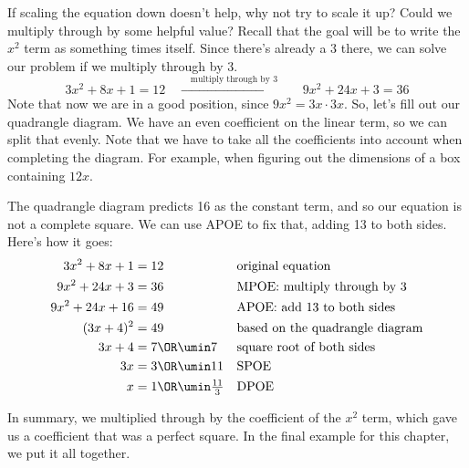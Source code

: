 If scaling the equation down doesn't help, why not try to scale it up? Could we multiply through by some helpful value? Recall that the goal will be to write the $x^2$ term as something times itself. Since there's already a 3 there, we can solve our problem if we multiply through by 3.
\[3x^2 + 8x + 1 = 12
\quad\xrightarrow{\quad\text{multiply through by 3}\quad}\quad
9x^2 + 24x + 3 = 36\]
Note that now we are in a good position, since $9x^2 = 3x\cdot3x$. So, let's fill out our quadrangle diagram. We have an even coefficient on the linear term, so we can split that evenly. Note that we have to take all the coefficients into account when completing the diagram. For example, when figuring out the dimensions of a box containing $12x$.


The quadrangle diagram predicts 16 as the constant term, and so our equation is not a complete square. We can use APOE to fix that, adding 13 to both sides. Here's how it goes:
\begin{align*}
3x^2 +8x + 1 &= 12
&&\text{original equation}
\\
9x^2 + 24x + 3 &= 36
&&\text{MPOE: multiply through by 3}
\\
9x^2 +24x + 16 &= 49
&&\text{APOE: add 13 to both sides}
\\
(3x+4)^2 &= 49
&&\text{based on the quadrangle diagram}
\\
3x+4 &= 7 \OR \umin7
&&\text{square root of both sides}
\\
3x &= 3 \OR \umin11
&&\text{SPOE}
\\
x &= 1 \OR \umin\tfrac{11}{3}
&&\text{DPOE}
\end{align*}

In summary, we multiplied through by the coefficient of the $x^2$ term, which gave us a coefficient that was a perfect square. In the final example for this chapter, we put it all together.

